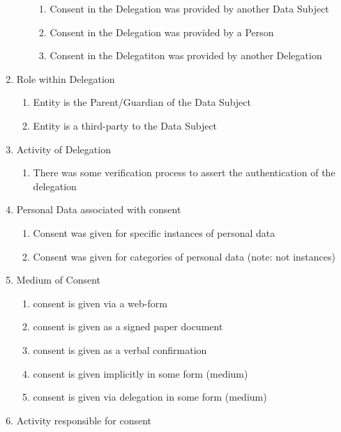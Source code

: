\begin{enumerate}
\begin{enumerate}
    \begin{enumerate}
    \item
      Consent in the Delegation was provided by another Data Subject
    \item
      Consent in the Delegation was provided by a Person
    \item
      Consent in the Delegatiton was provided by another Delegation
    \end{enumerate}
  \end{enumerate}
\item
  Role within Delegation

  \begin{enumerate}
  \item
    Entity is the Parent/Guardian of the Data Subject
  \item
    Entity is a third-party to the Data Subject
  \end{enumerate}
\item
  Activity of Delegation

  \begin{enumerate}
  \item
    There was some verification process to assert the authentication of
    the delegation
  \end{enumerate}
\item
  Personal Data associated with consent

  \begin{enumerate}
  \item
    Consent was given for specific instances of personal data
  \item
    Consent was given for categories of personal data (note: not
    instances)
  \end{enumerate}
\item
  Medium of Consent

  \begin{enumerate}
  \item
    consent is given via a web-form
  \item
    consent is given as a signed paper document
  \item
    consent is given as a verbal confirmation
  \item
    consent is given implicitly in some form (medium)
  \item
    consent is given via delegation in some form (medium)
  \end{enumerate}
\item
  Activity responsible for consent


\end{enumerate}
